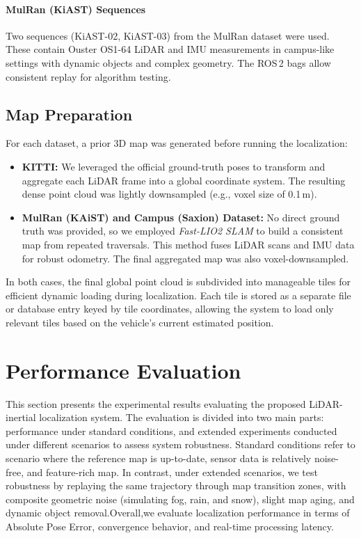 \paragraph{MulRan (KiAST) Sequences}
Two sequences (KiAST-02, KiAST-03) from the MulRan dataset\cite{Kim2020Mulran} were used. These contain Ouster OS1-64 LiDAR and IMU measurements in campus-like settings with dynamic objects and complex geometry. The ROS\,2 bags allow consistent replay for algorithm testing.

\subsection{Map Preparation}
For each dataset, a prior 3D map was generated before running the localization:

\begin{itemize}
    \item \textbf{KITTI:} We leveraged the official ground-truth poses to transform and aggregate each LiDAR frame into a global coordinate system. The resulting dense point cloud was lightly downsampled (e.g., voxel size of 0.1\,m).
    \item \textbf{MulRan (KAiST) and Campus (Saxion) Dataset:} No direct ground truth was provided, so we employed \textit{Fast-LIO2 SLAM} to build a consistent map from repeated traversals. This method fuses LiDAR scans and IMU data for robust odometry. The final aggregated map was also voxel-downsampled.
\end{itemize}

In both cases, the final global point cloud is subdivided into manageable tiles for efficient dynamic loading during localization. Each tile is stored as a separate file or database entry keyed by tile coordinates, allowing the system to load only relevant tiles based on the vehicle’s current estimated position.



\section{Performance Evaluation}
This section presents the experimental results evaluating the proposed LiDAR-inertial localization system. The evaluation is divided into two main parts: performance under standard conditions, and extended experiments conducted under different scenarios to assess system robustness. Standard conditions refer to scenario where the reference map is up-to-date, sensor data is relatively noise-free, and feature-rich map. In contrast, under extended scenarios, we test robustness by replaying the same trajectory through map transition zones, with composite geometric noise (simulating fog, rain, and snow), slight map aging, and dynamic object removal.Overall,we evaluate localization performance in terms of Absolute Pose Error, convergence behavior, and real-time processing latency.

